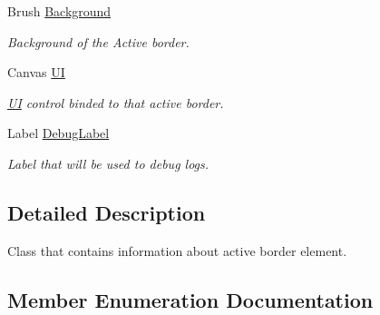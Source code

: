 \begin{DoxyCompactItemize}
Brush \mbox{\hyperlink{class_wpf_handler_1_1_u_i_1_1_controls_1_1_selectable_grid_1_1_active_border_ac2b78cb29099bb6f621f4d3e09b2f207}{Background}}
\begin{DoxyCompactList}\small\item\em Background of the Active border. \end{DoxyCompactList}\item 
Canvas \mbox{\hyperlink{class_wpf_handler_1_1_u_i_1_1_controls_1_1_selectable_grid_1_1_active_border_acbe79ad4ce3d41fd6c77d0d76f4232a5}{UI}}
\begin{DoxyCompactList}\small\item\em \mbox{\hyperlink{namespace_wpf_handler_1_1_u_i}{UI}} control binded to that active border. \end{DoxyCompactList}\item 
Label \mbox{\hyperlink{class_wpf_handler_1_1_u_i_1_1_controls_1_1_selectable_grid_1_1_active_border_a73053a9e93d6683b5cad389dee58152a}{Debug\+Label}}
\begin{DoxyCompactList}\small\item\em Label that will be used to debug logs. \end{DoxyCompactList}\end{DoxyCompactItemize}


\subsection{Detailed Description}
Class that contains information about active border element. 



\subsection{Member Enumeration Documentation}
\mbox{\label{class_wpf_handler_1_1_u_i_1_1_controls_1_1_selectable_grid_1_1_active_border_af87f3f6373b404c7f93985a70fffd8f0}} 
